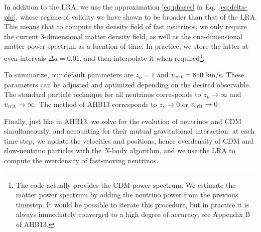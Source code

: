 \documentclass[useAMS, usenatbib]{mnras}
\begin{document}
In addition to the LRA, we use the approximation \eqref{eq:phases} in Eq.~\eqref{eq:delta-phi}, whose regime of validity we have shown to be broader than that of the LRA. This means that to compute the density field of fast neutrinos, we only require the current 3-dimensional matter density field, as well as the one-dimensional matter power spectrum as a fucntion of time. In practice, we store the latter at even intervals $\Delta a = 0.01$, and then interpolate it when required\footnote{The code actually provides the CDM power spectrum. We estimate the matter power spectrum by adding the neutrino power from the previous timestep. It would be possible to iterate this procedure, but in practice it is always immediately converged to a high degree of accuracy, see Appendix B of AHB13.}.




To summarize, our default parameters are $z_\nu = 1$ and $v_{\rm crit} = 850$ km/s. These parameters can be adjusted and optimized depending on the desired observable. The standard particle technique for all neutrinos corresponds to $z_\nu \rightarrow \infty$ and $v_{\rm crit} \rightarrow \infty$. The method of AHB13 corresponds to $z_\nu \rightarrow 0$ or $v_{\rm crit} \rightarrow 0$.

Finally, just like in AHB13, we solve for the evolution of neutrinos and CDM simultaneously, and accounting for their mutual gravitational interaction: at each time step, we update the velocities and positions, hence overdensity of CDM and slow-neutrino particles with the $N$-body algorithm, and we use the LRA to compute the overdensity of fast-moving neutrinos.

\end{document}
